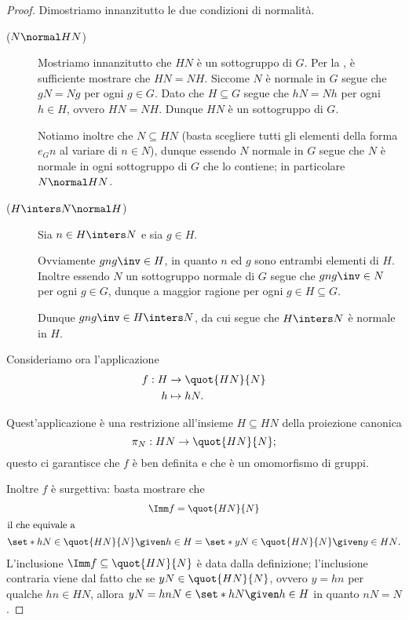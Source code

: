 \begin{proof}
    Dimostriamo innanzitutto le due condizioni di normalità.
    \begin{description}
        \item[($N \normal HN$)] Mostriamo innanzitutto che $HN$ è un sottogruppo di $G$. Per la , è sufficiente mostrare che $HN = NH$. 
        Siccome $N$ è normale in $G$ segue che $gN = Ng$ per ogni $g \in G$. Dato che $H \subseteq G$ segue che $hN = Nh$ per ogni $h \in H$, ovvero $HN = NH$.
        Dunque $HN$ è un sottogruppo di $G$.

        Notiamo inoltre che $N \subseteq HN$ (basta scegliere tutti gli elementi della forma $e_Gn$ al variare di $n \in N$), dunque essendo $N$ normale in $G$ segue che $N$ è normale in ogni sottogruppo di $G$ che lo contiene; in particolare $N \normal HN$.
        \item[($H \inters N \normal H$)] Sia $n \in H \inters N$ e sia $g \in H$.
        
        Ovviamente $gng\inv \in H$, in quanto $n$ ed $g$ sono entrambi elementi di $H$. Inoltre essendo $N$ un sottogruppo normale di $G$ segue che $gng\inv \in N$ per ogni $g \in G$, dunque a maggior ragione per ogni $g \in H \subseteq G$. 
        
        Dunque $gng\inv \in H \inters N$, da cui segue che $H \inters N$ è normale in $H$.
    \end{description}
    Consideriamo ora l'applicazione 
    \begin{align*}
        \begin{split}
            f : H &\to \quot{HN}{N} \\
            h &\mapsto hN.
        \end{split}
    \end{align*}  

    Quest'applicazione è una restrizione all'insieme $H \subseteq HN$ della proiezione canonica \[
        \pi_{N} : HN \to \quot{HN}{N};    
    \] questo ci garantisce che $f$ è ben definita e che è un omomorfismo di gruppi.
    
    Inoltre $f$ è surgettiva: basta mostrare che \begin{gather*}
        \Imm f = \quot{HN}{N}\\
        \intertext{il che equivale a}
        \set*{hN \in \quot{HN}{N} \given h \in H} = \set*{yN \in \quot{HN}{N} \given y \in HN}.
    \end{gather*}
    L'inclusione $\Imm f \subseteq \quot{HN}{N}$ è data dalla definizione; l'inclusione contraria viene dal fatto che se $yN \in \quot{HN}{N}$, ovvero $y = hn$ per qualche $hn \in HN$, allora $yN = hnN \in \set*{hN \given h \in H}$ in quanto $nN = N$.


\end{proof}

